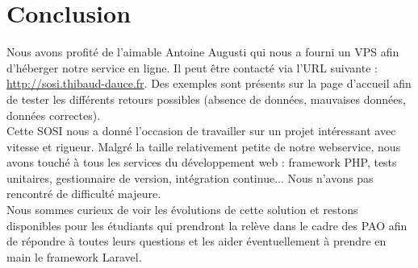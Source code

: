 \chapter*{Conclusion}

Nous avons profité de l'aimable Antoine Augusti qui nous a fourni un VPS afin d'héberger notre service en ligne. Il peut être contacté via l'URL suivante : \url{http://sosi.thibaud-dauce.fr}. Des exemples sont présents sur la page d'accueil afin de tester les différents retours possibles (absence de données, mauvaises données, données correctes).\\

Cette SOSI nous a donné l'occasion de travailler sur un projet intéressant avec vitesse et rigueur. Malgré la taille relativement petite de notre webservice, nous avons touché à tous les services du développement web : framework PHP, tests unitaires, gestionnaire de version, intégration continue... Nous n'avons pas rencontré de difficulté majeure.\\

Nous sommes curieux de voir les évolutions de cette solution et restons disponibles pour les étudiants qui prendront la relève dans le cadre des PAO afin de répondre à toutes leurs questions et les aider éventuellement à prendre en main le framework Laravel.
